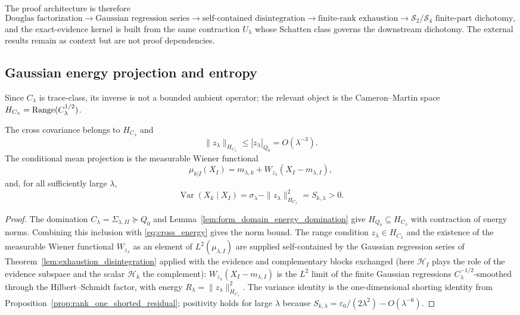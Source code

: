 The proof architecture is therefore
\[
  \text{Douglas factorization}
  \to\text{Gaussian regression series}
  \to\text{self-contained disintegration}
  \to\text{finite-rank exhaustion}
  \to\mathcal{S}_2/\mathcal{S}_4\text{ finite-part dichotomy},
\]
and the exact-evidence kernel is built from the same contraction $U_\lambda$
whose Schatten class governs the downstream dichotomy.  The external results
\cite{lagatta2013continuous,steinwart2024conditioning} remain as context but are
not proof dependencies.

\subsection{Gaussian energy projection and entropy}

Since $C_\lambda$ is trace-class, its inverse is not a bounded ambient operator;
the relevant object is the Cameron--Martin space
$H_{C_\lambda}=\operatorname{Range}(C_\lambda^{1/2})$.

\begin{lemma}
\label{lem:conditional_predictor}
The cross covariance belongs to $H_{C_\lambda}$ and
\[
  \|z_\lambda\|_{H_{C_\lambda}}
  \le |z_\lambda|_{Q_0}=O(\lambda^{-3}).
\]
The conditional mean projection is the measurable Wiener functional
\[
  \mu_{k|I}(X_I)
  =
  m_{\lambda,k}
  +W_{z_\lambda}(X_I-m_{\lambda,I}),
\]
and, for all sufficiently large $\lambda$,
\[
  \operatorname{Var}(X_k\mid X_I)
  =
  \sigma_\lambda-\|z_\lambda\|_{H_{C_\lambda}}^2
  =S_{k,\lambda}>0.
\]
\end{lemma}

\begin{proof}
The domination $C_\lambda=\Sigma_{\lambda,II}\succeq Q_0$ and
Lemma~\ref{lem:form_domain_energy_domination} give
$H_{Q_0}\subseteq H_{C_\lambda}$ with contraction of energy norms.  Combining
this inclusion with \eqref{eq:cross_energy} gives the norm bound.  The range
condition $z_\lambda\in H_{C_\lambda}$ and the existence of the measurable Wiener
functional $W_{z_\lambda}$ as an element of $L^2(\mu_{\lambda,I})$ are supplied
self-contained by the Gaussian regression series of
Theorem~\ref{lem:exhaustion_disintegration} applied with the evidence and
complementary blocks exchanged (here $\mathcal{H}_I$ plays the role of the
evidence subspace and the scalar $\mathcal{H}_k$ the complement):
$W_{z_\lambda}(X_I-m_{\lambda,I})$ is the $L^2$ limit of the finite Gaussian
regressions $C_\lambda^{-1/2}$-smoothed through the Hilbert--Schmidt factor, with
energy $R_\lambda=\|z_\lambda\|_{H_{C_\lambda}}^2$.  The variance identity is the
one-dimensional shorting identity from Proposition~\ref{prop:rank_one_shorted_residual};
positivity holds for large $\lambda$ because
$S_{k,\lambda}=\varepsilon_0/(2\lambda^2)-O(\lambda^{-6})$.
\end{proof}

